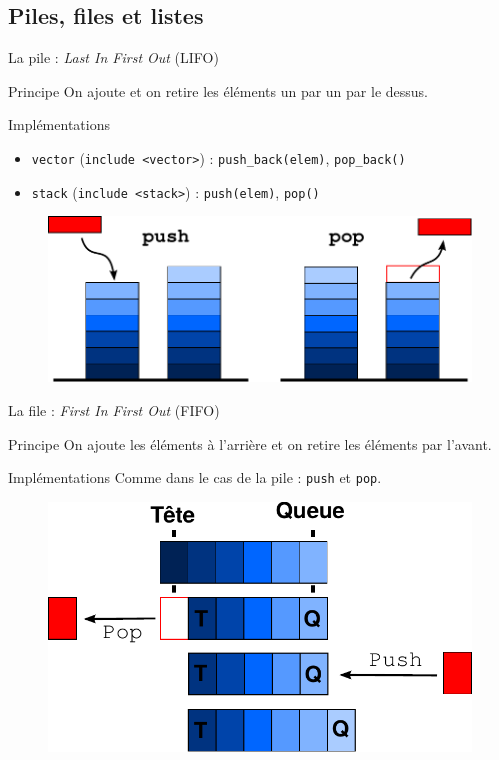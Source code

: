 \documentclass{beamer}
\begin{document}
\subsection{Piles, files et listes}
\begin{frame}{La pile : \textit{Last In First Out} (LIFO)}
\begin{block}{Principe}
On ajoute et on retire les éléments un par un par le dessus.
\end{block}

\begin{exampleblock}{Implémentations}
\begin{itemize}
    \item \texttt{vector} (\texttt{include <vector>}) : \texttt{push_back(elem)}, \texttt{pop_back()}
    \item \texttt{stack} (\texttt{include <stack>}) : \texttt{push(elem)}, \texttt{pop()}
\end{itemize}
\end{exampleblock}

\begin{figure}[ht!]
  \centering
  \includegraphics[width=0.5\linewidth]{./images/pile.pdf}
\end{figure}
\end{frame}



\begin{frame}{La file : \textit{First In First Out} (FIFO)}
\begin{block}{Principe}
On ajoute les éléments à l'arrière et on retire les éléments par l'avant.
\end{block}
\begin{exampleblock}{Implémentations}
Comme dans le cas de la pile : \texttt{push} et \texttt{pop}.
\end{exampleblock}

\begin{figure}[ht!]
  \centering
  \includegraphics[width = 0.5 \linewidth]{./images/file.pdf}
\end{figure}

\end{frame}
\end{document}
